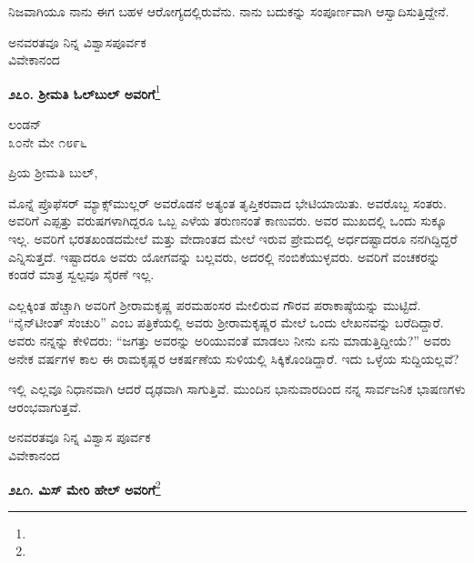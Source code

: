 \vspace{0.2cm}

ನಿಜವಾಗಿಯೂ ನಾನು ಈಗ ಬಹಳ ಆರೋಗ್ಯದಲ್ಲಿರುವೆನು. ನಾನು ಬದುಕನ್ನು ಸಂಪೂರ್ಣವಾಗಿ ಆಸ್ವಾದಿಸುತ್ತಿದ್ದೇನೆ.

\vspace{0.2cm}

{\flushright
ಅನವರತವೂ ನಿನ್ನ ವಿಶ್ವಾಸಪೂರ್ವಕ\\ವಿವೇಕಾನಂದ\par}

\begin{center}
\textbf{೨೭೦. ಶ‍್ರೀಮತಿ ಓಲ್‌ಬುಲ್‌ ಅವರಿಗೆ}\footnote{}
\end{center}

\begin{flushright}
ಲಂಡನ್\\೩೦ನೇ ಮೇ ೧೮೯೬
\end{flushright}

\noindent
ಪ್ರಿಯ ಶ‍್ರೀಮತಿ ಬುಲ್,

\vspace{0.2cm}

ಮೊನ್ನೆ ಪ್ರೊಫೆಸರ್ ಮ್ಯಾಕ್ಸ್‌ಮುಲ್ಲರ್ ಅವರೊಡನೆ ಅತ್ಯಂತ ತೃಪ್ತಿಕರವಾದ ಭೇಟಿಯಾಯಿತು. ಅವರೊಬ್ಬ ಸಂತರು. ಅವರಿಗೆ ಎಪ್ಪತ್ತು ವರುಷಗಳಾಗಿದ್ದರೂ ಒಬ್ಬ ಎಳೆಯ ತರುಣನಂತೆ ಕಾಣುವರು. ಅವರ ಮುಖದಲ್ಲಿ ಒಂದು ಸುಕ್ಕೂ ಇಲ್ಲ. ಅವರಿಗೆ ಭರತಖಂಡದಮೇಲೆ ಮತ್ತು ವೇದಾಂತದ ಮೇಲೆ ಇರುವ ಪ್ರೇಮದಲ್ಲಿ ಅರ್ಧದಷ್ಟಾದರೂ ನನಗಿದ್ದಿದ್ದರೆ ಎನ್ನಿಸುತ್ತದೆ. ಇಷ್ಟಾದರೂ ಅವರು ಯೋಗವನ್ನು ಬಲ್ಲವರು, ಅದರಲ್ಲಿ ನಂಬಿಕೆಯುಳ್ಳವರು. ಅವರಿಗೆ ವಂಚಕರನ್ನು ಕಂಡರೆ ಮಾತ್ರ ಸ್ವಲ್ಪವೂ ಸೈರಣೆ ಇಲ್ಲ.

\vspace{0.2cm}

ಎಲ್ಲಕ್ಕಿಂತ ಹೆಚ್ಚಾಗಿ ಅವರಿಗೆ ಶ‍್ರೀರಾಮಕೃಷ್ಣ ಪರಮಹಂಸರ ಮೇಲಿರುವ ಗೌರವ ಪರಾಕಾಷ್ಠೆಯನ್ನು ಮುಟ್ಟಿದೆ. “ನೈನ್‌ಟೀಂತ್ ಸೆಂಚುರಿ” ಎಂಬ ಪತ್ರಿಕೆಯಲ್ಲಿ ಅವರು ಶ‍್ರೀರಾಮಕೃಷ್ಣರ ಮೇಲೆ ಒಂದು ಲೇಖನವನ್ನು ಬರೆದಿದ್ದಾರೆ. ಅವರು ನನ್ನನ್ನು ಕೇಳಿದರು: “ಜಗತ್ತು ಅವರನ್ನು ಅರಿಯುವಂತೆ ಮಾಡಲು ನೀನು ಏನು ಮಾಡುತ್ತಿದ್ದೀಯೆ?” ಅವರು ಅನೇಕ ವರ್ಷಗಳ ಕಾಲ ಈ ರಾಮಕೃಷ್ಣರ ಆಕರ್ಷಣೆಯ ಸುಳಿಯಲ್ಲಿ ಸಿಕ್ಕಿಕೊಂಡಿದ್ದಾರೆ. ಇದು ಒಳ್ಳೆಯ ಸುದ್ದಿಯಲ್ಲವೆ?

\vspace{0.2cm}

ಇಲ್ಲಿ ಎಲ್ಲವೂ ನಿಧಾನವಾಗಿ ಆದರೆ ದೃಢವಾಗಿ ಸಾಗುತ್ತಿವೆ. ಮುಂದಿನ ಭಾನುವಾರದಿಂದ ನನ್ನ ಸಾರ್ವಜನಿಕ ಭಾಷಣಗಳು ಆರಂಭವಾಗುತ್ತವೆ.

{\flushright
ಅನವರತವೂ ನಿನ್ನ ವಿಶ್ವಾಸ ಪೂರ್ವಕ\\ವಿವೇಕಾನಂದ\par}

\begin{center}
\textbf{೨೭೧. ಮಿಸ್ ಮೇರಿ ಹೇಲ್ ಅವರಿಗೆ}\footnote{}
\end{center}

